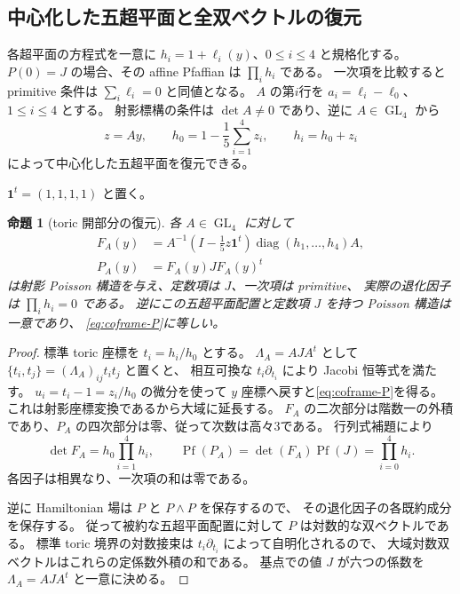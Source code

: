 \documentclass[11pt,a4paper]{ltjsarticle}
\DeclareMathOperator{\GL}{GL}
\newtheorem{proposition}[theorem]{命題}
\theoremstyle{remark}
\begin{document}
\subsection{中心化した五超平面と全双ベクトルの復元}
各超平面の方程式を一意に $h_i=1+\ell_i(y)$、$0\le i\le4$ と規格化する。
$P(0)=J$ の場合、その affine Pfaffian は $\prod_i h_i$ である。
一次項を比較すると primitive 条件は $\sum_i\ell_i=0$ と同値となる。
$A$ の第$i$行を $a_i=\ell_i-\ell_0$、$1\le i\le4$ とする。
射影標構の条件は $\det A\ne0$ であり、逆に $A\in\GL_4$ から
\begin{equation}\label{eq:coframe-h}
 z=Ay,\qquad h_0=1-\frac15\sum_{i=1}^4z_i,\qquad h_i=h_0+z_i
\end{equation}
によって中心化した五超平面を復元できる。

$\mathbf1^t=(1,1,1,1)$ と置く。
\begin{proposition}[toric 開部分の復元]\label{prop:coframe}
各 $A\in\GL_4$ に対して
\begin{align}
 F_A(y)&=A^{-1}\left(I-\frac15z\mathbf1^t\right)
          \operatorname{diag}(h_1,\ldots,h_4)A,\nonumber\\
 P_A(y)&=F_A(y)J F_A(y)^t\label{eq:coframe-P}
\end{align}
は射影 Poisson 構造を与え、定数項は $J$、一次項は primitive、
実際の退化因子は $\prod_i h_i=0$ である。
逆にこの五超平面配置と定数項 $J$ を持つ Poisson 構造は一意であり、
\eqref{eq:coframe-P}に等しい。
\end{proposition}
\begin{proof}
標準 toric 座標を $t_i=h_i/h_0$ とする。
$\Lambda_A=AJA^t$ として $\{t_i,t_j\}=(\Lambda_A)_{ij}t_it_j$ と置くと、
相互可換な $t_i\partial_{t_i}$ により Jacobi 恒等式を満たす。
$u_i=t_i-1=z_i/h_0$ の微分を使って $y$ 座標へ戻すと\eqref{eq:coframe-P}を得る。
これは射影座標変換であるから大域に延長する。
$F_A$ の二次部分は階数一の外積であり、$P_A$ の四次部分は零、従って次数は高々3である。
行列式補題により
\[
 \det F_A=h_0\prod_{i=1}^4h_i,\qquad
 \operatorname{Pf}(P_A)=\det(F_A)\operatorname{Pf}(J)=\prod_{i=0}^4h_i.
\]
各因子は相異なり、一次項の和は零である。

逆に Hamiltonian 場は $P$ と $P\wedge P$ を保存するので、
その退化因子の各既約成分を保存する。
従って被約な五超平面配置に対して $P$ は対数的な双ベクトルである。
標準 toric 境界の対数接束は $t_i\partial_{t_i}$ によって自明化されるので、
大域対数双ベクトルはこれらの定係数外積の和である。
基点での値 $J$ が六つの係数を $\Lambda_A=AJA^t$ と一意に決める。
\end{proof}
\end{document}
